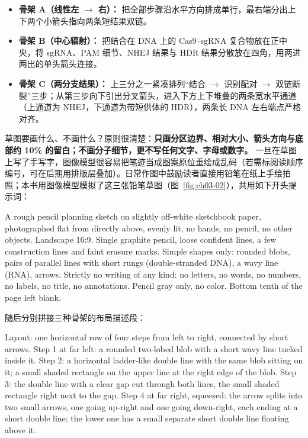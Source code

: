 \begin{itemize}
\item \textbf{骨架 A（线性左 $\rightarrow$ 右）：} 把全部步骤沿水平方向排成单行，最右端分出上下两个小箭头指向两条短结果双链。
\item \textbf{骨架 B（中心辐射）：} 把结合在 DNA 上的 Cas9–sgRNA 复合物放在正中央，将 sgRNA、PAM 细节、NHEJ 结果与 HDR 结果分散放在四角，用两进两出的单头箭头连接。
\item \textbf{骨架 C（两分支结果）：} 上三分之一紧凑排列“结合 $\rightarrow$ 识别配对 $\rightarrow$ 双链断裂”三步；从第三步向下引出分叉箭头，进入下方上下堆叠的两条宽水平通道（上通道为 NHEJ，下通道为带短供体的 HDR），两条长 DNA 左右端点严格对齐。
\end{itemize}

草图要画什么、不画什么？原则很清楚：\textbf{只画分区边界、相对大小、箭头方向与底部约 10\% 的留白；不画分子细节，更不写任何文字、字母或数字。} 一旦在草图上写了手写字，图像模型很容易把笔迹当成图案原位重绘成乱码（若需标阅读顺序编号，可在后期用排版层叠加）。日常作图中鼓励读者直接用铅笔在纸上手绘拍照；本书用图像模型模拟了这三张铅笔草图（图~\ref{fig:ch03-02}），共用如下开头提示词：

\begin{Prompt}
A rough pencil planning sketch on slightly off-white sketchbook paper, photographed flat from directly above, evenly lit, no hands, no pencil, no other objects. Landscape 16:9. Single graphite pencil, loose confident lines, a few construction lines and faint erasure marks. Simple shapes only: rounded blobs, pairs of parallel lines with short rungs (double-stranded DNA), a wavy line (RNA), arrows. Strictly no writing of any kind: no letters, no words, no numbers, no labels, no title, no annotations. Pencil gray only, no color. Bottom tenth of the page left blank.
\end{Prompt}

随后分别拼接三种骨架的布局描述段：

\begin{Prompt}
[A - Linear] Layout: one horizontal row of four steps from left to right, connected by short arrows. Step 1 at far left: a rounded two-lobed blob with a short wavy line tucked inside it. Step 2: a horizontal ladder-like double line with the same blob sitting on it; a small shaded rectangle on the upper line at the right edge of the blob. Step 3: the double line with a clear gap cut through both lines, the small shaded rectangle right next to the gap. Step 4 at far right, squeezed: the arrow splits into two small arrows, one going up-right and one going down-right, each ending at a short double line; the lower one has a small separate short double line floating above it.
\end{Prompt}

